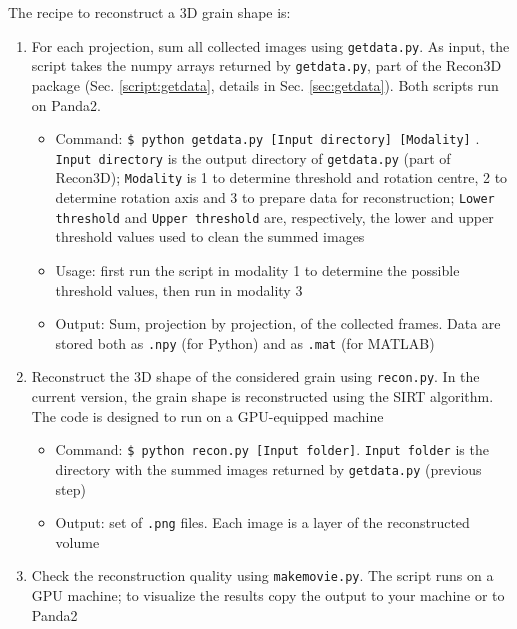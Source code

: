 \documentclass[11pt]{scrartcl}
\begin{document}
The recipe to reconstruct a {\footnotesize{3D}} grain shape is:
\begin{enumerate}
    \item For each projection, sum all collected images using {\texttt{getdata.py}}. As input, the script takes the numpy arrays returned by {\texttt{getdata.py}}, part of the Recon3D package (Sec. \ref{script:getdata}, details in Sec. \ref{sec:getdata}). Both scripts run on Panda2.
    \begin{itemize}
        \item Command: {\texttt{\$ python getdata.py [Input directory] [Modality]}} . {\texttt{Input directory}} is the output directory of {\texttt{getdata.py}} (part of Recon3D); {\texttt{Modality}} is 1 to determine threshold and rotation centre, 2 to determine rotation axis and 3 to prepare data for reconstruction; {\texttt{Lower threshold}} and {\texttt{Upper threshold}} are, respectively, the lower and upper threshold values used to clean the summed images
        \item Usage: first run the script in modality 1 to determine the possible threshold values, then run in modality 3
        \item Output: Sum, projection by projection, of the collected frames. Data are stored both as {\texttt{.npy}} (for Python) and as {\texttt{.mat}} (for {\footnotesize{MATLAB}})
    \end{itemize}
    \item Reconstruct the {\footnotesize{3D}} shape of the considered grain using {\texttt{recon.py}}. In the current version, the grain shape is reconstructed using the {\footnotesize{SIRT}} algorithm. The code is designed to run on a {\footnotesize{GPU}}-equipped machine
    \begin{itemize}
        \item Command: {\texttt{\$ python recon.py [Input folder]}}. {\texttt{Input folder}} is the directory with the summed images returned by {\texttt{getdata.py}} (previous step)
        \item Output: set of {\texttt{.png}} files. Each image is a layer of the reconstructed volume
    \end{itemize}
    \item Check the reconstruction quality using {\texttt{makemovie.py}}. The script runs on a {\footnotesize{GPU}} machine; to visualize the results copy the output to your machine or to Panda2
\end{enumerate}
\end{document}
